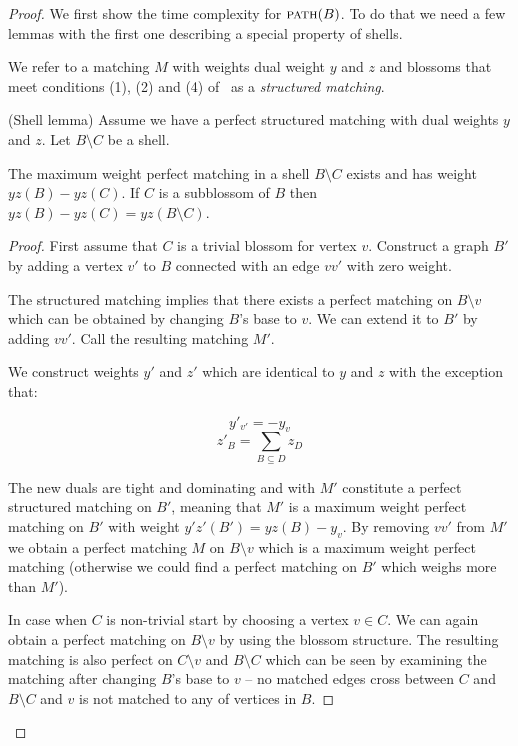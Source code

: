 \begin{proof}

    We first show the time complexity for $\textsc{path}(B)$. To do that we need a few lemmas with the first one describing a special property of shells.

    We refer to a matching $M$ with weights dual weight $y$ and $z$ and blossoms that meet conditions (1), (2) and (4) of~ as a \emph{structured matching}.

\begin{lemma}{(Shell lemma)}\label{lem:shell}
    Assume we have a perfect structured matching with dual weights $y$ and $z$. Let $B \setminus C$ be a shell.

    The maximum weight perfect matching in a shell $B \setminus C$ exists and has weight $yz(B) - yz(C)$. If $C$ is a subblossom of $B$ then $yz(B) - yz(C) = yz(B \setminus C)$. 
\end{lemma}

\begin{proof}
    First assume that $C$ is a trivial blossom for vertex $v$. Construct a graph $B'$ by adding a vertex $v'$ to $B$ connected with an edge $vv'$ with zero weight. 
    
    The structured matching implies that there exists a perfect matching on $B \setminus v$ which can be obtained by changing $B$'s base to $v$. We can extend it to $B'$ by adding $vv'$. Call the resulting matching $M'$.

    We construct weights $y'$ and $z'$ which are identical to $y$ and $z$ with the exception that:

    \[y'_{v'} = -y_v \]
    \[z'_B = \sum_{B \subseteq D} z_D \]

    The new duals are tight and dominating and with $M'$ constitute a perfect structured matching on $B'$, meaning that $M'$ is a maximum weight perfect matching on $B'$ with weight $y'z'(B') = yz(B) - y_v$. By removing $vv'$ from $M'$ we obtain a perfect matching $M$ on $B \setminus v$ which is a maximum weight perfect matching (otherwise we could find a perfect matching on $B'$ which weighs more than $M'$).

    In case when $C$ is non-trivial start by choosing a vertex $v \in C$. We can again obtain a perfect matching on $B \setminus v$ by using the blossom structure. The resulting matching is also perfect on $C \setminus v$ and $B \setminus C$ which can be seen by examining the matching after changing $B$'s base to $v$ – no matched edges cross between $C$ and $B \setminus C$ and $v$ is not matched to any of vertices in $B$.


\end{proof}
\end{proof}
